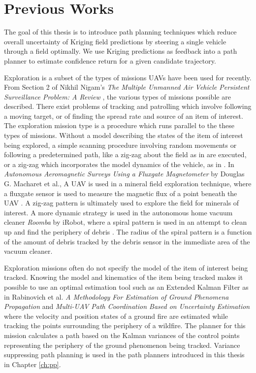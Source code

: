 \section{Previous Works} \label{sec:prev_works}
The goal of this thesis is to introduce path planning techniques which reduce overall uncertainty of Kriging field predictions by steering a single vehicle through a field optimally. We use Kriging predictions as feedback into a path planner to estimate confidence return for a given candidate trajectory.

Exploration is a subset of the types of missions UAVs have been used for recently. From Section 2 of Nikhil Nigam's \textit{The Multiple Unmanned Air Vehicle Persistent Surveillance Problem: A Review} \cite{nigam:missions}, the various types of missions possible are described. There exist problems of tracking and patrolling which involve following a moving target, or of finding the spread rate and source of an item of interest. The exploration mission type is a procedure which runs parallel to the these types of missions. Without a model describing the states of the item of interest being explored, a simple scanning procedure involving random movements or following a predetermined path, like a zig-zag about the field as in \cite{semsch:uav_zig} are executed, or a zig-zag which incorporates the model dynamics of the vehicle, as in \cite{nigam:zigzag}. In \textit{Autonomous Aeromagnetic Surveys Using a Fluxgate Magnetometer} by Douglas G. Macharet et al., A UAV is used in a mineral field exploration technique, where a fluxgate sensor is used to measure the magnetic flux of a point beneath the UAV \cite{macharet:magnet}. A zig-zag pattern is ultimately used to explore the field for minerals of interest. A more dynamic strategy is used in the autonomous home vacuum cleaner \textit{Roomba} by iRobot, where a spiral pattern is used in an attempt to clean up and find the periphery of debris \cite{roomba:spiral}. The radius of the spiral pattern is a function of the amount of debris tracked by the debris sensor in the immediate area of the vacuum cleaner.

Exploration missions often do not specify the model of the item of interest being tracked. Knowing the model and kinematics of the item being tracked makes it possible to use an optimal estimation tool such as an Extended Kalman Filter as in Rabinovich et al. \textit{A Methodology For Estimation of Ground Phenomena Propagation} \cite{sharon:uav_est} and \textit{Multi-UAV Path Coordination Based on Uncertainty Estimation} \cite{sharon:uav_uncert} where the velocity and position states of a ground fire are estimated while tracking the points surrounding the periphery of a wildfire. The planner for this mission calculates a path based on the Kalman variances of the control points representing the periphery of the ground phenomenon being tracked. Variance suppressing path planning is used in the path planners introduced in this thesis in Chapter \ref{ch:pp}.

